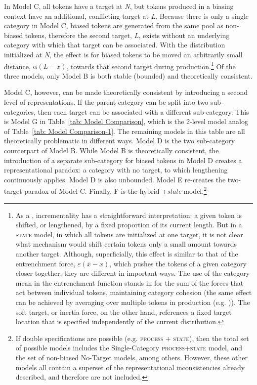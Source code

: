 In Model C, all tokens have a target at \emph{N}, but tokens produced
in a biasing context have an additional, conflicting target at \emph{L}.
Because there is only a single category in Model C, biased tokens
are generated from the same pool as non-biased tokens, therefore the
second target, \emph{L}, exists without an underlying category with
which that target can be associated. With the distribution initialized
at \emph{N}, the effect is for biased tokens to be moved an arbitrarily
small distance, $\alpha(L-x)$, towards that second target during
production.\footnote{As a , incrementality has a straightforward interpretation:
a given token is shifted, or lengthened, by a fixed proportion of
its current length. But in a \textsc{state} model, in which all tokens
are initialized at one target, it is not clear what mechanism would
shift certain tokens only a small amount towards another target. Although,
superficially, this effect is similar to that of the entrenchment
force, $\varepsilon(\overline{x}-x)$, which pushes the tokens of
a given category closer together, they are different in important
ways. The use of the category mean in the entrenchment function stands
in for the sum of the forces that act between individual tokens, maintaining
category cohesion (the same effect can be achieved by averaging over
multiple tokens in production (e.g. \citealt{Pierrehumbert2000,Wedela})).
The soft target, or inertia force, on the other hand, references a
fixed target location that is specified independently of the current
distribution. } Of the three models, only Model B is both stable (bounded) and
theoretically consistent. 

Model C, however, can be made theoretically consistent by introducing
a second level of representations. If the parent category can be split
into two sub-categories, then each target can be associated with a
different sub-category. This is Model G in Table~\ref{tab: Model Comparison},
which is the 2-level model analog of Table~\ref{tab: Model Comparison-1}.
The remaining models in this table are all theoretically problematic
in different ways. Model D is the two sub-category counterpart of
Model B. While Model B is theoretically consistent, the introduction
of a separate sub-category for biased tokens in Model D creates a
representational paradox: a category with no target, to which lengthening
continuously applies. Model D is also unbounded. Model E re-creates
the two-target paradox of Model C. Finally, F is the hybrid +\emph{state}
model.\footnote{If double specifications are possible (e.g. \textsc{process} + \textsc{state}),
then the total set of possible models includes the Single-Category
\textsc{process}+\textsc{state} model, and the set of non-biased No-Target
models, among others. However, these other models all contain a superset
of the representational inconsistencies already described, and therefore
are not included.}

